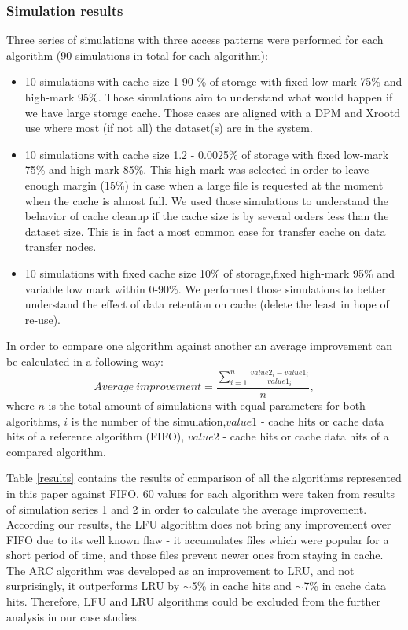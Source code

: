 \documentclass[english]{ddny}
\begin{document}
\subsubsection{Simulation results}
Three series of simulations with three access patterns were performed for each algorithm (90 simulations in total for each algorithm): 
\begin{itemize}
\item 10 simulations with cache size 1-90 \% of storage with fixed low-mark 75\% and high-mark 95\%. Those simulations aim to understand what would happen if we have large storage cache. Those cases are aligned with a DPM and Xrootd use where most (if not all) the dataset(s) are in the system.
\item 10 simulations with cache size 1.2 - 0.0025\% of storage with fixed low-mark 75\% and high-mark 85\%. This high-mark was selected in order to leave enough margin (15\%) in case when a large file is requested at the moment when the cache is almost full. We used those simulations to understand the behavior of cache cleanup if the cache size is by several orders less than the dataset size. This is in fact a most common case for transfer cache on data transfer nodes.
\item 10 simulations with fixed cache size 10\% of storage,fixed high-mark 95\% and  variable low mark  within 0-90\%. We performed those simulations to better understand the effect of data retention on cache (delete the least in hope of re-use).
\end{itemize}

In order to compare one algorithm against another an average improvement can be calculated in a following way:
\begin{equation}
Average~improvement = \frac{\sum^{n}_{i=1}\frac{value2_{i}-value1_{i}}{value1_{i}}}{n},
\end{equation}
where $n$ is the total amount of simulations with equal parameters for both algorithms, $i$ is the number of the simulation,$value1$ - cache hits or cache data hits of a reference algorithm (FIFO), $value2$ - cache hits or cache data hits of a compared algorithm.

Table \ref{results} contains the results of comparison of all the algorithms represented in this paper against FIFO. 60 values for each algorithm were taken from results of simulation series 1 and 2 in order to calculate the average improvement. According our results, the LFU algorithm does not bring any improvement over FIFO due to its well known flaw - it accumulates files which were popular for a short period of time, and those files prevent newer ones from staying in cache. The ARC algorithm was developed as an improvement to LRU, and not surprisingly, it outperforms LRU by $\sim$5\% in cache hits and $\sim$7\% in cache data hits. Therefore, LFU and LRU algorithms could be excluded from the further analysis in our case studies.
\end{document}
